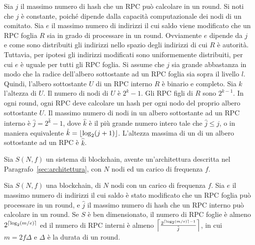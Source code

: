 Sia $j$ il massimo numero di hash che un RPC può calcolare in un round. Si noti che $j$ è constante, poiché dipende dalla capacità computazionale dei nodi di un comitato. Sia $e$ il massimo numero di indirizzi il cui saldo viene modificato che un RPC foglia $R$ sia in grado di processare in un round. Ovviamente $e$ dipende da $j$ e come sono distribuiti gli indirizzi nello spazio degli indirizzi di cui $R$ è autorità. Tuttavia, per ipotesi gli indirizzi modificati sono uniformemente distribuiti, per cui $e$ è uguale per tutti gli RPC foglia. Si assume che $j$ sia grande abbastanza in modo che la radice dell'albero sottostante ad un RPC foglia sia sopra il livello $l$. Quindi, l'albero sottostante $U$ di un RPC interno $R$ è binario e completo. Sia $k$ l'altezza di $U$. Il numero di nodi di $U$ è $2^k-1$. Gli RPC figli di $R$ sono $2^{k-1}$. In ogni round, ogni RPC deve calcolare un hash per ogni nodo del proprio albero sottostante $U$. Il massimo numero di nodi in un albero sottostante ad un RPC interno è $\hat{j} = 2^{\hat{k}}-1$, dove $\hat{k}$ è il più grande numero intero tale che $\hat{j} \leq j$, o in maniera equivalente $\hat{k} = \floor*{\log_2 (j+1)}$. L'altezza massima di un di un albero sottostante ad un RPC è $\hat{k}$.

Sia $S(N, f)$ un sistema di blockchain, avente un'architettura descritta nel Paragrafo~\ref{sec:architettura}, con $N$ nodi ed un carico di frequenza $f$.

\begin{lemma}\label{lemma:rpc_count}
Sia $S(N, f)$ una blockchain, di $N$ nodi con un carico di frequenza $f$. Sia $e$ il massimo numero di indirizzi il cui saldo è stato modificato che un RPC foglia può processare in un round, e $\hat{j}$ il massimo numero di hash che un RPC interno può calcolare in un round. Se $S$ è ben dimensionato, il numero di RPC foglie è almeno $2^{\ceil*{\log_2 (m/e)}}$ ed il numero di RPC interni è almeno $\ceil*{\frac{2^{\ceil*{\log_2 (m/e)} - 1}}{\hat{j}}}$, in cui $m = 2 f \Delta$ e $\Delta$ è la durata di un round.
\end{lemma}

